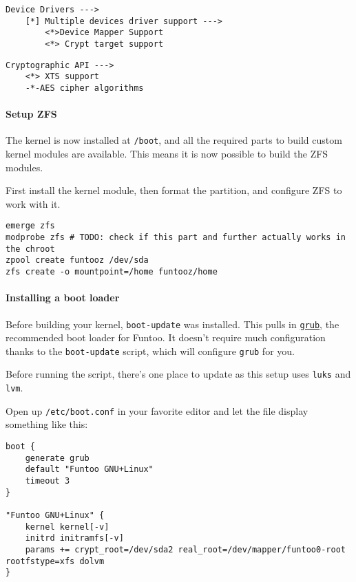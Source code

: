 \begin{verbatim}
Device Drivers --->
    [*] Multiple devices driver support --->
        <*>Device Mapper Support
        <*> Crypt target support
\end{verbatim}

\begin{verbatim}
Cryptographic API --->
    <*> XTS support
    -*-AES cipher algorithms
\end{verbatim}

\paragraph{Setup ZFS}\label{setup-zfs}

The kernel is now installed at \texttt{/boot}, and all the required
parts to build custom kernel modules are available. This means it is now
possible to build the ZFS modules.

First install the kernel module, then format the partition, and
configure ZFS to work with it.

\begin{verbatim}
emerge zfs
modprobe zfs # TODO: check if this part and further actually works in the chroot
zpool create funtooz /dev/sda
zfs create -o mountpoint=/home funtooz/home
\end{verbatim}

\paragraph{Installing a boot loader}\label{installing-a-boot-loader}

Before building your kernel, \texttt{boot-update} was installed. This
pulls in \href{https://en.wikipedia.org/wiki/GNU_GRUB}{\texttt{grub}},
the recommended boot loader for Funtoo. It doesn't require much
configuration thanks to the \texttt{boot-update} script, which will
configure \texttt{grub} for you.

Before running the script, there's one place to update as this setup
uses \texttt{luks} and \texttt{lvm}.

Open up \texttt{/etc/boot.conf} in your favorite editor and let the file
display something like this:

\begin{verbatim}
boot {
    generate grub
    default "Funtoo GNU+Linux"
    timeout 3
}

"Funtoo GNU+Linux" {
    kernel kernel[-v]
    initrd initramfs[-v]
    params += crypt_root=/dev/sda2 real_root=/dev/mapper/funtoo0-root rootfstype=xfs dolvm
}
\end{verbatim}

